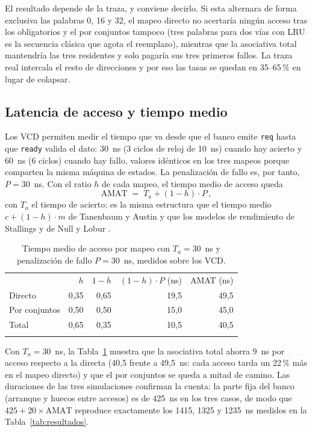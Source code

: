 \documentclass[llncs]{llncs}
\begin{document}
El resultado depende de la traza, y conviene decirlo. Si esta
alternara de forma exclusiva las palabras 0, 16 y 32, el mapeo directo
no acertaría ningún acceso tras los obligatorios y el por conjuntos
tampoco (tres palabras para dos vías con LRU es la secuencia clásica
que agota el reemplazo), mientras que la asociativa total mantendría las
tres residentes y solo pagaría sus tres primeros fallos. La traza real
intercala el resto de direcciones y por eso las tasas se quedan en
35--65\,\% en lugar de colapsar.

\subsection{Latencia de acceso y tiempo medio}

Los VCD permiten medir el tiempo que va desde que el banco emite
\texttt{req} hasta que \texttt{ready} valida el dato: 30~ns (3 ciclos
de reloj de 10~ns) cuando hay acierto y 60~ns (6 ciclos) cuando hay
fallo, valores idénticos en los tres mapeos porque comparten la misma
máquina de estados. La penalización de fallo es, por tanto,
$P = 30$~ns. Con el ratio $h$ de cada mapeo, el tiempo medio de acceso
queda
\[
  \mathrm{AMAT} \;=\; T_a + (1-h)\cdot P \,,
\]
con $T_a$ el tiempo de acierto; es la misma estructura que el tiempo
medio $c + (1-h)\cdot m$ de Tanenbaum y Austin \cite{tanenbaum2013} y
que los modelos de rendimiento de Stallings \cite{stallings2019} y de
Null y Lobur \cite{null2024}.

\begin{table}[t]
\centering
\small
\begin{tabular}{@{}lrrrr@{}}
\hline
\noalign{\smallskip}
 & $h$ & $1-h$ & $(1-h)\cdot P$ (ns) & AMAT (ns) \\
\noalign{\smallskip}\hline\noalign{\smallskip}
Directo & 0,35 & 0,65 & 19,5 & 49,5 \\
Por conjuntos & 0,50 & 0,50 & 15,0 & 45,0 \\
Total & 0,65 & 0,35 & 10,5 & 40,5 \\
\noalign{\smallskip}\hline
\end{tabular}
\caption{Tiempo medio de acceso por mapeo con $T_a = 30$~ns y
penalización de fallo $P = 30$~ns, medidos sobre los VCD.}
\label{tab:amat}
\end{table}

Con $T_a = 30$~ns, la Tabla~\ref{tab:amat} muestra que la asociativa
total ahorra 9~ns por acceso respecto a la directa (40,5 frente a
49,5~ns: cada acceso tarda un 22\,\% más en el mapeo directo) y que el
por conjuntos se queda a mitad de camino. Las duraciones de las tres
simulaciones confirman la cuenta: la parte fija del banco (arranque y
huecos entre accesos) es de 425~ns en los tres casos, de modo que
$425 + 20 \times \mathrm{AMAT}$ reproduce exactamente los 1415, 1325 y
1235~ns medidos en la Tabla~\ref{tab:resultados}.
\end{document}
